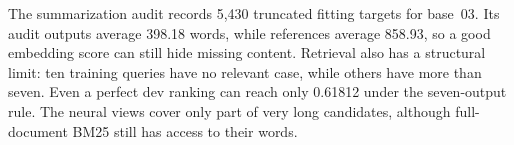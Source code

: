 The summarization audit records 5,430 truncated fitting targets for base~03. Its audit outputs average 398.18 words, while references average 858.93, so a good embedding score can still hide missing content. Retrieval also has a structural limit: ten training queries have no relevant case, while others have more than seven. Even a perfect dev ranking can reach only 0.61812 under the seven-output rule. The neural views cover only part of very long candidates, although full-document BM25 still has access to their words.
